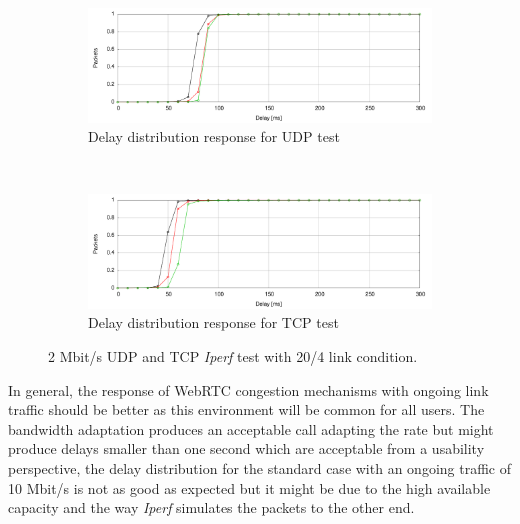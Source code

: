 \begin{figure}
        \centering
        \begin{subfigure}[b]{0.5\textwidth}
                \centering
                \includegraphics[width=\textwidth]{./figures/2m_udp_total_delay_distribution.pdf}
                \caption{Delay distribution response for UDP test}
                \label{fig:2m_udp_total_delay_distribution}
        \end{subfigure}%
        ~ %
        \begin{subfigure}[b]{0.5\textwidth}
                \centering
                \includegraphics[width=\textwidth]{./figures/2m_tcp_total_delay_distribution.pdf}
                \caption{Delay distribution response for TCP test}
                \label{fig:2m_tcp_total_delay_distribution}
        \end{subfigure}
        \caption[2 Mbit/s UDP and TCP {\it Iperf} test with 20/4 link condition]{2 Mbit/s UDP and TCP {\it Iperf} test with 20/4 link condition.}
        \label{fig:2m_tcp_udp_distribution}
\end{figure}

In general, the response of WebRTC congestion mechanisms with ongoing link traffic should be better as this environment will be common for all users. The bandwidth adaptation produces an acceptable call adapting the rate but might produce delays smaller than one second which are acceptable from a usability perspective, the delay distribution for the standard case with an ongoing traffic of 10 Mbit/s is not as good as expected but it might be due to the high available capacity and the way {\it Iperf} simulates the packets to the other end.

